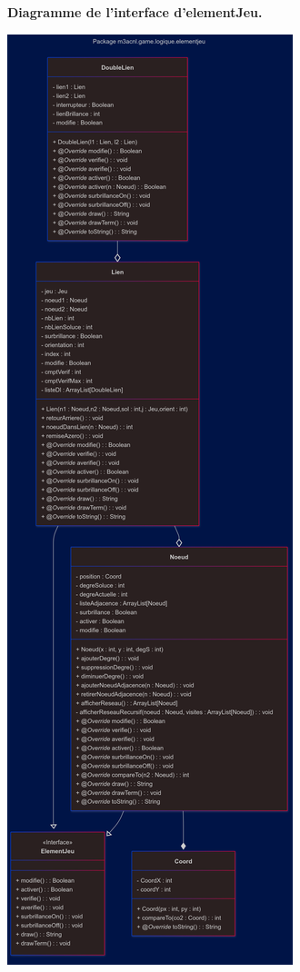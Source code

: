 \pagebreak

\textbf{Diagramme de l'interface d'elementJeu.}\\
\begin{center}
    \includegraphics[width=\textwidth,height=\dimexpr\textheight-40pt\relax,keepaspectratio]{../Annexe/classes/elementJeu.png}
\end{center}

